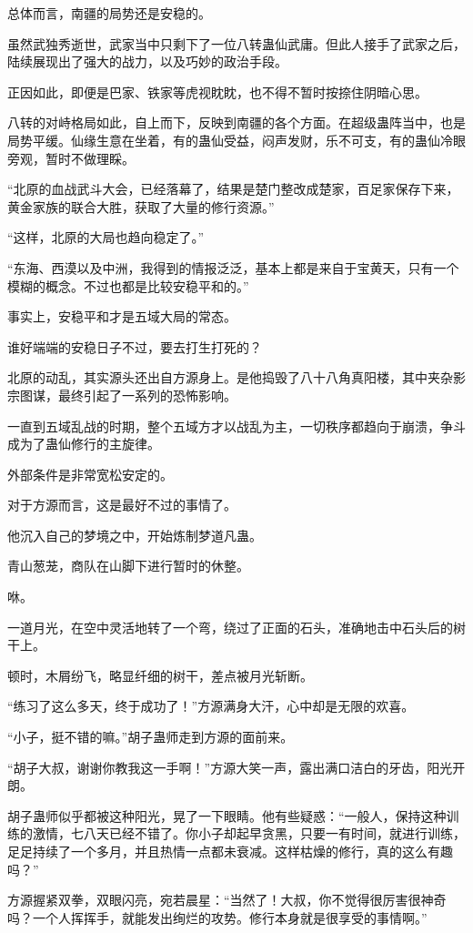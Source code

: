 \begin{this_body}
总体而言，南疆的局势还是安稳的。

虽然武独秀逝世，武家当中只剩下了一位八转蛊仙武庸。但此人接手了武家之后，陆续展现出了强大的战力，以及巧妙的政治手段。

正因如此，即便是巴家、铁家等虎视眈眈，也不得不暂时按捺住阴暗心思。

八转的对峙格局如此，自上而下，反映到南疆的各个方面。在超级蛊阵当中，也是局势平缓。仙缘生意在坐着，有的蛊仙受益，闷声发财，乐不可支，有的蛊仙冷眼旁观，暂时不做理睬。

“北原的血战武斗大会，已经落幕了，结果是楚门整改成楚家，百足家保存下来，黄金家族的联合大胜，获取了大量的修行资源。”

“这样，北原的大局也趋向稳定了。”

“东海、西漠以及中洲，我得到的情报泛泛，基本上都是来自于宝黄天，只有一个模糊的概念。不过也都是比较安稳平和的。”

事实上，安稳平和才是五域大局的常态。

谁好端端的安稳日子不过，要去打生打死的？

北原的动乱，其实源头还出自方源身上。是他捣毁了八十八角真阳楼，其中夹杂影宗图谋，最终引起了一系列的恐怖影响。

一直到五域乱战的时期，整个五域方才以战乱为主，一切秩序都趋向于崩溃，争斗成为了蛊仙修行的主旋律。

外部条件是非常宽松安定的。

对于方源而言，这是最好不过的事情了。

他沉入自己的梦境之中，开始炼制梦道凡蛊。

青山葱茏，商队在山脚下进行暂时的休整。

咻。

一道月光，在空中灵活地转了一个弯，绕过了正面的石头，准确地击中石头后的树干上。

顿时，木屑纷飞，略显纤细的树干，差点被月光斩断。

“练习了这么多天，终于成功了！”方源满身大汗，心中却是无限的欢喜。

“小子，挺不错的嘛。”胡子蛊师走到方源的面前来。

“胡子大叔，谢谢你教我这一手啊！”方源大笑一声，露出满口洁白的牙齿，阳光开朗。

胡子蛊师似乎都被这种阳光，晃了一下眼睛。他有些疑惑：“一般人，保持这种训练的激情，七八天已经不错了。你小子却起早贪黑，只要一有时间，就进行训练，足足持续了一个多月，并且热情一点都未衰减。这样枯燥的修行，真的这么有趣吗？”

方源握紧双拳，双眼闪亮，宛若晨星：“当然了！大叔，你不觉得很厉害很神奇吗？一个人挥挥手，就能发出绚烂的攻势。修行本身就是很享受的事情啊。”

\end{this_body}

